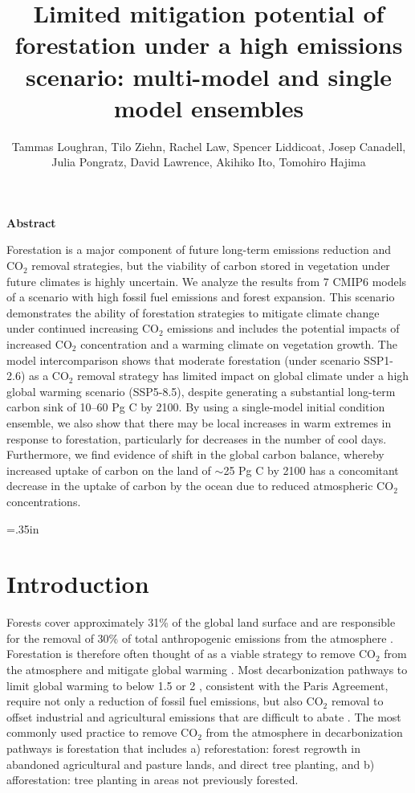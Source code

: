 \documentclass[]{article}
\title{Limited mitigation potential of forestation under a high emissions scenario: multi-model and single model ensembles}
\author{Tammas Loughran, Tilo Ziehn, Rachel Law, Spencer Liddicoat, Josep Canadell, Julia Pongratz, David Lawrence, Akihiko Ito, Tomohiro Hajima}
\begin{document}
\maketitle

\begin{center}
    \Large
    \vspace{0.9cm}
    \textbf{Abstract}
\end{center}

Forestation is a major component of future long-term emissions reduction and CO$_2$ removal strategies, but the viability of carbon stored in vegetation under future climates is highly uncertain.
We analyze the results from 7 CMIP6 models of a scenario with high fossil fuel emissions and forest expansion.
This scenario demonstrates the ability of forestation strategies to mitigate climate change under continued increasing CO$_2$ emissions and includes the potential impacts of increased CO$_2$ concentration and a warming climate on vegetation growth.
The model intercomparison shows that moderate forestation (under scenario SSP1-2.6)  as a CO$_2$ removal strategy has limited impact on global climate under a high global warming scenario (SSP5-8.5), despite generating a substantial long-term carbon sink of 10--60 Pg C by 2100.
By using a single-model initial condition ensemble, we also show that there may be local increases in warm extremes in response to forestation, particularly for decreases in the number of cool days.
Furthermore, we find evidence of shift in the global carbon balance, whereby increased uptake of carbon on the land of $\sim$25 Pg C by 2100 has a concomitant decrease in the uptake of carbon by the ocean due to reduced atmospheric CO$_2$ concentrations.

\raggedright
\parindent=.35in %

\section{Introduction}

Forests cover approximately 31\% of the global land surface \parencite{luyssaert_land_2014,fao_global_2020} and are responsible for the removal of 30\% of total anthropogenic emissions from the atmosphere \parencite{friedlingstein_global_2022}.
Forestation is therefore often thought of as a viable strategy to remove CO$_2$ from the atmosphere and mitigate global warming \parencite{house_maximum_2002, griscom_natural_2017, smith_long-term_2022}.
Most decarbonization pathways to limit global warming to below 1.5 or 2 \textcelsius{}, consistent with the Paris Agreement, require not only a reduction of fossil fuel emissions, but also CO$_2$ removal to offset industrial and agricultural emissions that are difficult to abate \parencite{babiker_crosssectoral_2022}.
The most commonly used practice to remove CO$_2$ from the atmosphere in decarbonization pathways is forestation that includes a) reforestation: forest regrowth in abandoned agricultural and pasture lands, and direct tree planting, and b) afforestation: tree planting in areas not previously forested.
\end{document}

